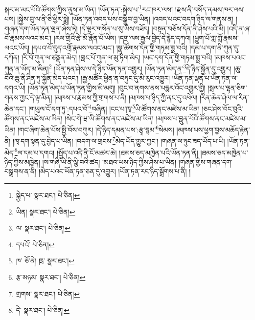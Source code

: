 སྐར་མ་མང་པོའི་ཚོགས་ཀྱིས་ནུས་མ་ཡིན། །ཡོན་ཏན་:སྐྱེས་པ་\footnote{སྐྱེད་པ་  སྣར་ཐང་།  པེ་ཅིན། }རང་ཁར་ལས། །རྫས་ནི་བསོད་ནམས་ཁར་ལས་པས། །སྐྱེས་བུ་ལ་ནི་ཅི་ཕྱིར་སྨྲེ། །ཡོན་ཏན་འབད་པས་བསྒྲུབ་བྱ་ཡིན། །འབད་པའང་བདག་ཉིད་ལ་གནས་ན། །གཞན་དག་ཡོན་ཏན་ལྡན་ཞེས་ཏེ། །དེ་ལྟར་གསོན་པ་སུ་ཡིས་བཟོད། །བསྟན་བཅོས་དོན་ནི་ཤེས་པའི་མི། །འདི་ན་ཞ་བོ་རྣམས་ལའང་མང་། །རལ་གྲིའི་རྩེ་མོ་རྣོན་པོ་ཡིས། །དགྲ་ལས་རྒྱལ་བྱེད་དེ་རྙེད་དཀའ། །ཕྱུག་པོ་ཀླ་ཀློ་རྣམས་ལའང་ཡོད། །དཔའ་བོ་དུད་འགྲོ་རྣམས་ལའང་མང་། །སྣ་ཚོགས་དོན་གྱི་གཏམ་སྨྲ་བའི། །དམ་པ་དག་ནི་ཀུན་དུ་དཀོན། །རི་བོ་ཀུན་ལ་ཙནྡན་མེད། །གླང་པོ་ཀུན་ལ་མུ་ཏིག་མེད། །ཡང་དག་དོན་གྱི་གཏམ་སྨྲ་བའི། །མཁས་པའང་ཀུན་ན་ཡོད་མ་མིན།\footnote{ཡིན།  སྣར་ཐང་།  པེ་ཅིན། } །ཡོན་ཏན་ཤེས་ལ་དེ་ཉིད་ཡོན་ཏན་འགྱུར། །ཡོན་ཏན་མེད་ན་\footnote{ལ་  སྣར་ཐང་།  པེ་ཅིན། }དེ་ཉིད་སྐྱོན་དུ་འགྱུར། །ཆུ་བོའི་ཆུ་ནི་ཤིན་ཏུ་སྐྱོན་མེད་པའང་། །རྒྱ་མཚོར་ཕྱིན་ན་བཏུང་དུ་མི་རུང་འགྱུར། །ཡོན་ཏན་ལྡན་པ་ཡོན་ཏན་ལ་དགའ་ཡི། །ཡོན་ཏན་མེད་པ་ཡོན་ཏན་གྱིས་མི་མགུ། །བུང་བ་ནགས་ནས་པདྨར་འོང་འགྱུར་གྱི། །སྦལ་པ་ལྷན་ཅིག་གནས་ཀྱང་དེ་ལྟ་མིན། །མཁས་པ་རྣམས་ཀྱི་གྲགས་པ་ནི། །མཁས་པ་ཉིད་ཀྱི་ནང་དུ་འཕེལ། །རིན་ཆེན་ཤེལ་ལ་རིན་ཆེན་དང་། །གཡུལ་ངོ་དག་ཏུ་:དཔའ་བོ་\footnote{དཔའོ་  པེ་ཅིན། }བཞིན། །ངང་པ་ཁྭ་\footnote{ཁ་  ཅོ་ནེ། ཁྲ་  སྣར་ཐང་། }ཡི་ཚོགས་ནང་མཛེས་མ་ཡིན། །ཅང་ཤེས་བོང་བུའི་ཚོགས་ནང་མཛེས་མ་ཡིན། །སེང་གེ་ཝ་ཡི་ཚོགས་ནང་མཛེས་མ་ཡིན། །མཁས་པ་བླུན་པོའི་ཚོགས་ནང་མཛེས་མ་ཡིན། །གང་ཞིག་ཆེན་པོས་སྤྱི་བོས་བཀུར། །དེ་ཉིད་དམན་པས་:རྩྭ་སྙམ་\footnote{རྩ་མཉམ་  སྣར་ཐང་།  པེ་ཅིན། }སེམས། །མཁས་པས་ཕྱག་བྱས་མཆོད་རྟེན་ནི། །ཁྭ་དག་སྟན་དུ་བྱེད་པ་ཡིན། །བདག་ལ་གྲངས་\footnote{གྲགས་  སྣར་ཐང་།  པེ་ཅིན། }མེད་ཡོད་གྱུར་ཀྱང་། །གཞན་ལ་ཉུང་ཟད་ཡོད་པ་ཡི། །ཡོན་ཏན་མེད་\footnote{དེ་  སྣར་ཐང་།  པེ་ཅིན། }ལ་དམ་པ་དགའ། །སྤྱོད་པ་འདི་ནི་ངོ་མཚར་ཆེ། །ཐམས་ཅད་མཁྱེན་པའི་ཡོན་ཏན་ནི། །ཐམས་ཅད་མཁྱེན་པ་ཉིད་ཀྱིས་མཁྱེན། །ས་གཞི་ཡི་ནི་ལྕི་བའི་ཚད། །མཐའ་ཡས་ཉིད་ཀྱིས་ཤེས་པ་ཡིན། །གཞན་གྱིས་གཞན་དག་བསྒྲགས་ན་ནི། །མེད་པའང་ཡོན་ཏན་ཅན་དུ་འགྱུར། །ཡོན་ཏན་རང་ཉིད་སྒྲོགས་པ་ནི། །
